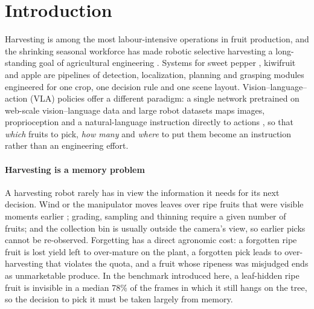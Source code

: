 \section{Introduction}
\label{sec:intro}

Harvesting is among the most labour-intensive operations in fruit production, and the shrinking seasonal workforce has made robotic selective harvesting a long-standing goal of agricultural engineering \citep{bac2014harvesting,kootstra2021selective,zhou2022intelligent}. Systems for sweet pepper \citep{arad2020sweetpepper}, kiwifruit \citep{williams2019kiwifruit} and apple \citep{silwal2017apple} are pipelines of detection, localization, planning and grasping modules engineered for one crop, one decision rule and one scene layout. Vision--language--action (VLA) policies offer a different paradigm: a single network pretrained on web-scale vision--language data and large robot datasets maps images, proprioception and a natural-language instruction directly to actions \citep{brohan2023rt2,kim2024openvla,black2024pi0,pi05_2025}, so that \emph{which} fruits to pick, \emph{how many} and \emph{where} to put them become an instruction rather than an engineering effort.

\paragraph{Harvesting is a memory problem} A harvesting robot rarely has in view the information it needs for its next decision. Wind or the manipulator moves leaves over ripe fruits that were visible moments earlier \citep{hemming2014detectability}; grading, sampling and thinning require a given number of fruits; and the collection bin is usually outside the camera's view, so earlier picks cannot be re-observed. Forgetting has a direct agronomic cost: a forgotten ripe fruit is lost yield left to over-mature on the plant, a forgotten pick leads to over-harvesting that violates the quota, and a fruit whose ripeness was misjudged ends as unmarketable produce. In the benchmark introduced here, a leaf-hidden ripe fruit is invisible in a median 78\% of the frames in which it still hangs on the tree, so the decision to pick it must be taken largely from memory.

